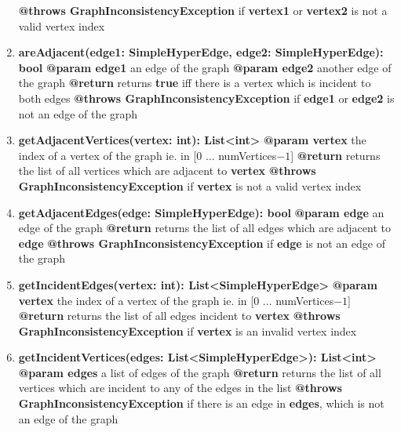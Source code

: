 \begin{enumerate}[+]
{			\textbf{@throws GraphInconsistencyException} if \textbf{vertex1} or \textbf{vertex2} is not a valid vertex index
		}
		\item{
			\textbf{areAdjacent(edge1: SimpleHyperEdge, edge2: SimpleHyperEdge): bool} \newline
			\textbf{@param edge1} an edge of the graph \newline
			\textbf{@param edge2} another edge of the graph \newline
			\textbf{@return} returns \textbf{true} iff there is a vertex which is incident to both edges \newline
			\textbf{@throws GraphInconsistencyException} if \textbf{edge1} or \textbf{edge2} is not an edge of the graph
		}
		\item{
			\textbf{getAdjacentVertices(vertex: int): List<int>} \newline
			\textbf{@param vertex} the index of a vertex of the graph ie. in [0 ... numVertices$-1$] \newline
			\textbf{@return} returns the list of all vertices which are adjacent to \textbf{vertex} \newline
			\textbf{@throws GraphInconsistencyException} if \textbf{vertex} is not a valid vertex index
		}
		\item{
			\textbf{getAdjacentEdges(edge: SimpleHyperEdge): bool} \newline
			\textbf{@param edge} an edge of the graph \newline
			\textbf{@return} returns the list of all edges which are adjacent to \textbf{edge} \newline
			\textbf{@throws GraphInconsistencyException} if \textbf{edge} is not an edge of the graph
		}
		\item{
			\textbf{getIncidentEdges(vertex: int): List<SimpleHyperEdge>} \newline
			\textbf{@param vertex} the index of a vertex of the graph ie. in [0 ... numVertices$-1$] \newline
			\textbf{@return} returns the list of all edges incident to \textbf{vertex} \newline
			\textbf{@throws GraphInconsistencyException} if \textbf{vertex} is an invalid vertex index
		}
		\item{
			\textbf{getIncidentVertices(edges: List<SimpleHyperEdge>): List<int>} \newline
			\textbf{@param edges} a list of edges of the graph \newline
			\textbf{@return} returns the list of all vertices which are incident to any of the edges in the list \newline
			\textbf{@throws GraphInconsistencyException} if there is an edge in \textbf{edges}, which is not an edge of the graph
			
}
\end{enumerate}
